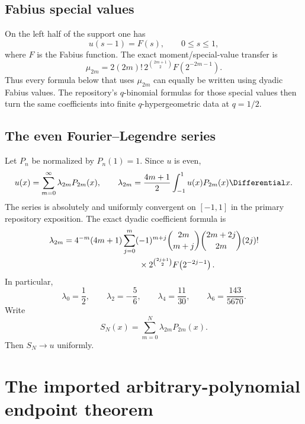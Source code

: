 \documentclass[11pt,oneside]{article}
\theoremstyle{definition}
\theoremstyle{remark}
\begin{document}
\subsection{Fabius special values}
On the left half of the support one has
\begin{equation}
 u(s-1)=F(s),\qquad0\le s\le1,
 \label{eq:F-up}
\end{equation}
where $F$ is the Fabius function.  The exact moment/special-value transfer is
\begin{equation}
 \boxed{
 \mu_{2m}=2(2m)!\,2^{\binom{2m+1}{2}}
 F\!\left(2^{-2m-1}\right).}
 \label{eq:moment-Fabius}
\end{equation}
Thus every formula below that uses $\mu_{2m}$ can equally be written using
dyadic Fabius values.  The repository's $q$-binomial formulas for those
special values then turn the same coefficients into finite
$q$-hypergeometric data at $q=1/2$.

\subsection{The even Fourier--Legendre series}
Let $P_n$ be normalized by $P_n(1)=1$.  Since $u$ is even,
\begin{equation}
 u(x)=\sum_{m=0}^{\infty}\lambda_{2m}P_{2m}(x),
 \qquad
 \lambda_{2m}=\frac{4m+1}{2}\int_{-1}^{1}u(x)P_{2m}(x)\Differential x.
 \label{eq:legendre-series}
\end{equation}
The series is absolutely and uniformly convergent on $[-1,1]$ in the primary
repository exposition.  The exact dyadic coefficient formula is
\begin{align}
 \lambda_{2m}
 &=4^{-m}(4m+1)
 \sum_{j=0}^{m}(-1)^{m+j}
 \binom{2m}{m+j}\binom{2m+2j}{2m}(2j)!\notag\\
 &\hspace{32mm}\times
 2^{\binom{2j+1}{2}}F\!\left(2^{-2j-1}\right).
 \label{eq:lambda-dyadic}
\end{align}
In particular,
\begin{equation}
 \lambda_0=\frac12,
 \qquad \lambda_2=-\frac56,
 \qquad \lambda_4=\frac{11}{30},
 \qquad \lambda_6=\frac{143}{5670}.
 \label{eq:first-lambda}
\end{equation}
Write
\begin{equation}
 S_N(x)=\sum_{m=0}^{N}\lambda_{2m}P_{2m}(x).
 \label{eq:SN}
\end{equation}
Then $S_N\to u$ uniformly.

\section{The imported arbitrary-polynomial endpoint theorem}
\label{sec:imported-endpoint}
\end{document}
